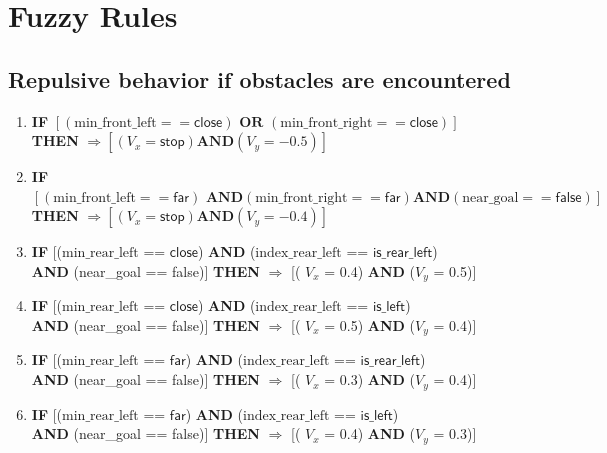 \section{Fuzzy Rules} 
\subsection{Repulsive behavior if obstacles are encountered}

\begin{enumerate}
    \small
	\item \textbf{IF} $\left[\left( \text{min\_front\_left} == \textsf{close}\right) \textbf{ OR } \left(\text{min\_front\_right} == \textsf{close}\right)\right]$\\ 
	\textbf{THEN} $\Rightarrow\left[\left( V_x = \textsf{stop} \right) \textbf{AND} \left(V_y = -0.5\right)\right]$
	
	\item \textbf{IF} $ \left[\left( \text{min\_front\_left} == \textsf{far}\right) \textbf{ AND} \left(\text{min\_front\_right} == \textsf{far}\right) \textbf{AND} \left(\text{near\_goal} == \textsf{false}\right)
	\right]$\\ 
	\textbf{THEN} $\Rightarrow\left[\left( V_x = \textsf{stop} \right) \textbf{AND} \left(V_y = -0.4\right)\right]$
	
	\item \textbf{IF} [($\text{min\_rear\_left}$ == $\textsf{close}$) \textbf{AND} ($\text{index\_rear\_left}$ == $\textsf{is\_rear\_left}$)\\
	\textbf{AND} (near\_goal == \textsf{false})]
	\textbf{THEN} $\Rightarrow$ [( $V_x$ = \textsf{0.4}) \textbf{AND} ($V_y$ = \textsf{0.5})]
	
	\item \textbf{IF} [($\text{min\_rear\_left}$ == $\textsf{close}$) \textbf{AND} ($\text{index\_rear\_left}$ == $\textsf{is\_left}$)\\
	\textbf{AND} (near\_goal == \textsf{false})]		\textbf{THEN} $\Rightarrow$ [( $V_x$ = \textsf{0.5}) \textbf{AND} ($V_y$ = \textsf{0.4})]

	\item \textbf{IF} [($\text{min\_rear\_left}$ == $\textsf{far}$) \textbf{AND} ($\text{index\_rear\_left}$ == $\textsf{is\_rear\_left}$)\\
	\textbf{AND} (near\_goal == \textsf{false})]
	\textbf{THEN} $\Rightarrow$ [( $V_x$ = \textsf{0.3}) \textbf{AND} ($V_y$ = \textsf{0.4})]

	\item \textbf{IF} [($\text{min\_rear\_left}$ == $\textsf{far}$) \textbf{AND} ($\text{index\_rear\_left}$ == $\textsf{is\_left}$)\\
	\textbf{AND} (near\_goal == \textsf{false})]
	\textbf{THEN} $\Rightarrow$ [( $V_x$ = \textsf{0.4}) \textbf{AND} ($V_y$ = \textsf{0.3})]


\end{enumerate}
